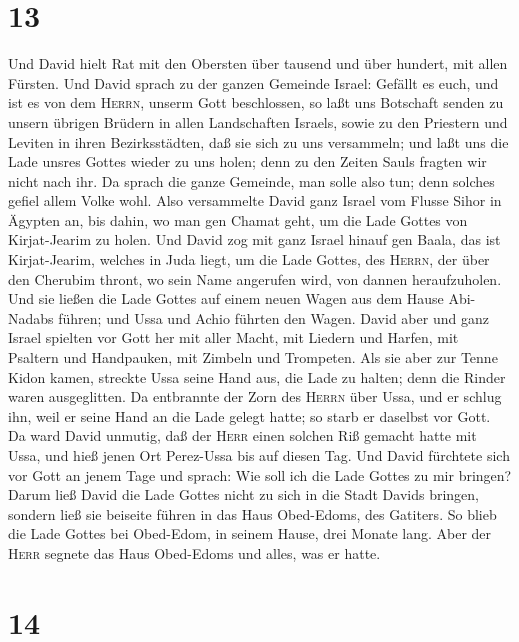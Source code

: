 \hypertarget{section-12}{%
\section{13}\label{section-12}}

 Und David hielt Rat mit den Obersten über tausend und
über hundert, mit allen Fürsten.  Und David sprach zu der
ganzen Gemeinde Israel: Gefällt es euch, und ist es von dem
\textsc{Herrn}, unserm Gott beschlossen, so laßt uns Botschaft senden zu
unsern übrigen Brüdern in allen Landschaften Israels, sowie zu den
Priestern und Leviten in ihren Bezirksstädten, daß sie sich zu uns
versammeln;  und laßt uns die Lade unsres Gottes wieder zu
uns holen; denn zu den Zeiten Sauls fragten wir nicht nach ihr.
 Da sprach die ganze Gemeinde, man solle also tun; denn
solches gefiel allem Volke wohl.  Also versammelte David
ganz Israel vom Flusse Sihor in Ägypten an, bis dahin, wo man gen Chamat
geht, um die Lade Gottes von Kirjat-Jearim zu holen.  Und
David zog mit ganz Israel hinauf gen Baala, das ist Kirjat-Jearim,
welches in Juda liegt, um die Lade Gottes, des \textsc{Herrn}, der über
den Cherubim thront, wo sein Name angerufen wird, von dannen
heraufzuholen.  Und sie ließen die Lade Gottes auf einem
neuen Wagen aus dem Hause Abi-Nadabs führen; und Ussa und Achio führten
den Wagen.  David aber und ganz Israel spielten vor Gott
her mit aller Macht, mit Liedern und Harfen, mit Psaltern und
Handpauken, mit Zimbeln und Trompeten.  Als sie aber zur
Tenne Kidon kamen, streckte Ussa seine Hand aus, die Lade zu halten;
denn die Rinder waren ausgeglitten.  Da entbrannte der
Zorn des \textsc{Herrn} über Ussa, und er schlug ihn, weil er seine Hand
an die Lade gelegt hatte; so starb er daselbst vor Gott. 
Da ward David unmutig, daß der \textsc{Herr} einen solchen Riß gemacht
hatte mit Ussa, und hieß jenen Ort Perez-Ussa bis auf diesen Tag.
 Und David fürchtete sich vor Gott an jenem Tage und
sprach: Wie soll ich die Lade Gottes zu mir bringen? 
Darum ließ David die Lade Gottes nicht zu sich in die Stadt Davids
bringen, sondern ließ sie beiseite führen in das Haus Obed-Edoms, des
Gatiters.  So blieb die Lade Gottes bei Obed-Edom, in
seinem Hause, drei Monate lang. Aber der \textsc{Herr} segnete das Haus
Obed-Edoms und alles, was er hatte.

\hypertarget{section-13}{%
\section{14}\label{section-13}}

